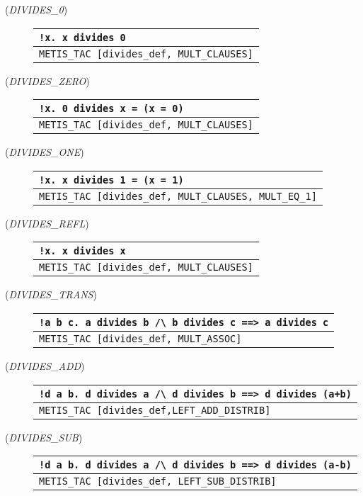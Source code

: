 \begin{description}
\label{euclid:extra-proofs}
\item [\small{({\it DIVIDES\_0\/})}]
\begin{tabular}[t]{l}
\verb+!x. x divides 0+ \\ \hline
 \verb+METIS_TAC [divides_def, MULT_CLAUSES]+
\end{tabular}

\item[\small{({\it DIVIDES\_ZERO\/})}]
\begin{tabular}[t]{l}
\verb+!x. 0 divides x = (x = 0)+ \\ \hline
 \verb+METIS_TAC [divides_def, MULT_CLAUSES]+
\end{tabular}

\item[\small{({\it DIVIDES\_ONE\/})}]
\begin{tabular}[t]{l}
\verb+!x. x divides 1 = (x = 1)+ \\ \hline
 \verb+METIS_TAC [divides_def, MULT_CLAUSES, MULT_EQ_1]+
\end{tabular}

\item[\small{({\it DIVIDES\_REFL\/})}]
\begin{tabular}[t]{l}
\verb+!x. x divides x+ \\ \hline
 \verb+METIS_TAC [divides_def, MULT_CLAUSES]+ \\
\end{tabular}

\item[\small{({\it DIVIDES\_TRANS\/})}]
\begin{tabular}[t]{l}
\verb+!a b c. a divides b /\ b divides c ==> a divides c+ \\ \hline
 \verb+METIS_TAC [divides_def, MULT_ASSOC]+ \\
\end{tabular}
\item[\small{({\it DIVIDES\_ADD\/})}]
\begin{tabular}[t]{l}
\verb|!d a b. d divides a /\ d divides b ==> d divides (a+b)| \\ \hline
 \verb|METIS_TAC [divides_def,LEFT_ADD_DISTRIB]|
\end{tabular}

\item[\small{({\it DIVIDES\_SUB\/})}]
\begin{tabular}[t]{l}
\verb+!d a b. d divides a /\ d divides b ==> d divides (a-b)+ \\ \hline
 \verb+METIS_TAC [divides_def, LEFT_SUB_DISTRIB]+ \\
\end{tabular}


\end{description}
